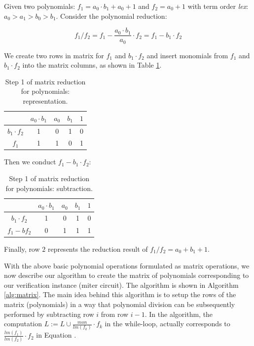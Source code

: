 \begin{Example}\label{exp:division}
Given two polynomials: $f_{1}=a_{0}\cdot b_{1}+a_{0}+1$ and
$f_{2}=a_{0}+1$ with term order {\it lex}:
$a_{0}>a_{1}>b_{0}>b_{1}$. Consider the polynomial reduction:

\begin{equation}
{f_1}/{f_2}=f_{1}-\frac{a_{0}\cdot b_{1}}{a_{0}}\cdot f_{2} =f_{1}-b_{1}\cdot f_{2} \nonumber
\end{equation}
	 
We create two rows in matrix for $f_{1}$ and $b_{1}\cdot f_{2}$ and
insert monomials from $f_{1}$ and $b_{1}\cdot f_{2}$ into the matrix
columns, as shown in Table \ref{tab:red}.  
	 
	\begin{table}[htb]
	\begin{center}
	\caption{ Step 1 of matrix reduction for polynomials: representation.}
	\label{tab:red}
	\begin{tabular}{|c|c|c|c|c|} \hline 
			&$a_{0} \cdot b_{1}$ & $a_{0}$ & $b_{1}$ & $1$  \\
	\hline 
	$b_{1}\cdot f_{2}$ & 1 &0 & 1  & 0 \\ 
	\hline
	$f_{1}$ & 1 &1 & 0 & 1  \\
	\hline
	\end{tabular}
	\end{center}
	\end{table}
	
	Then we conduct $f_{1}-b_{1}\cdot f_{2}$:
	
	\begin{table}[htb]
	\begin{center}
	\caption{Step 1 of matrix reduction for polynomials: subtraction.}
	\label{tab:red2}
	\begin{tabular}{|c|c|c|c|c|} \hline 
			&$a_{0} \cdot b_{1}$ & $a_{0}$ & $b_{1}$ & $1$  \\
	\hline 
	$b_{1}\cdot f_{2}$ & 1 &0 & 1  & 0 \\ 
	\hline
	$f_{1} - b f_2$ & 0 &1 & 1 & 1  \\
	\hline
	\end{tabular}
	\end{center}
	\end{table}
	
	Finally, row $2$ represents the reduction result of ${f_1}/{f_2}=a_{0}+b_{1}+1$.
	
 \end{Example}

With the above basic polynomial operations formulated as matrix
operations, we now describe our algorithm to create the matrix of
polynomials corresponding to our verification instance (miter
circuit). The algorithm is shown in Algorithm \ref{alg:matrix}. The
main idea behind this algorithm is to setup the rows  of
the matrix (polynomials) in a way that polynomial division can be
subsequently performed by subtracting row $i$ from row $i-1$. In the
algorithm, the computation $L:=L \cup \frac{mon}{lm(f_{k})}\cdot
f_{k}$ in the while-loop, actually corresponds to  
$\frac{lm(f_1)}{lm(f_2)}\cdot f_{2} $ in
Equation \label{eqn:mat-red}. 


